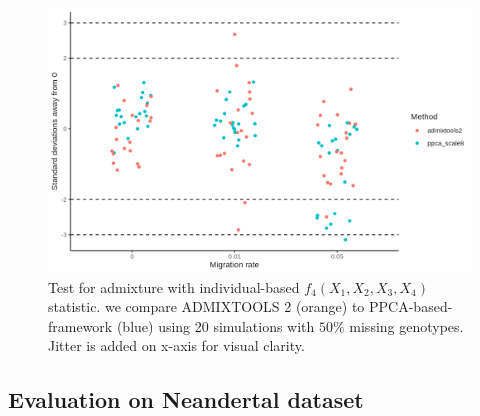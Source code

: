 \documentclass[12pt]{article}
\begin{document}
\begin{figure}[ht!]
    \includegraphics[width=16.5cm]{Images/ppca/Figures/hypothesis_test_comparison.png}
    \centering
         \caption{Test for admixture with individual-based $f_4(X_1, X_2, X_3, X_4)$ statistic. we compare ADMIXTOOLS 2 (orange) to PPCA-based-framework (blue) using 20 simulations with $50\%$ missing genotypes. Jitter is added on x-axis for visual clarity.}
    \label{fig:admixture}
\end{figure}

\subsection{Evaluation on Neandertal dataset}
\end{document}
